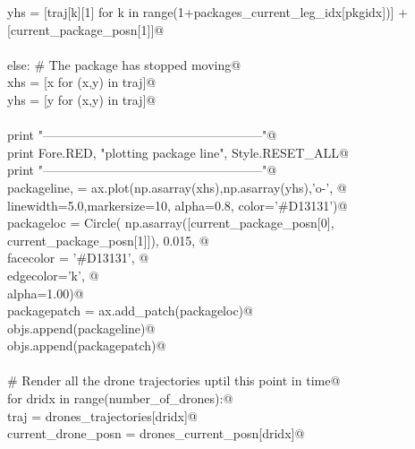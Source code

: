 \documentclass[10.0pt]{report}
\begin{document}
\begin{appendices}
\begin{flushleft}
\begin{list}{}{}
\mbox{}\verb@                  yhs = [traj[k][1] for k in range(1+packages_current_leg_idx[pkgidx])] + [current_package_posn[1]]@\\
\mbox{}\verb@@\\
\mbox{}\verb@            else: # The package has stopped moving@\\
\mbox{}\verb@                  xhs = [x for (x,y) in traj]@\\
\mbox{}\verb@                  yhs = [y for (x,y) in traj]@\\
\mbox{}\verb@@\\
\mbox{}\verb@            print "-----------------------------------------------------"@\\
\mbox{}\verb@            print Fore.RED, "plotting package line", Style.RESET_ALL@\\
\mbox{}\verb@            print "-----------------------------------------------------"@\\
\mbox{}\verb@            packageline, = ax.plot(np.asarray(xhs),np.asarray(yhs),'o-', @\\
\mbox{}\verb@                                   linewidth=5.0,markersize=10, alpha=0.8, color='#D13131')@\\
\mbox{}\verb@            packageloc   = Circle( np.asarray([current_package_posn[0], current_package_posn[1]]), 0.015, @\\
\mbox{}\verb@                                    facecolor = '#D13131', @\\
\mbox{}\verb@                                    edgecolor='k',  @\\
\mbox{}\verb@                                    alpha=1.00)@\\
\mbox{}\verb@            packagepatch = ax.add_patch(packageloc)@\\
\mbox{}\verb@            objs.append(packageline)@\\
\mbox{}\verb@            objs.append(packagepatch)@\\
\mbox{}\verb@@\\
\mbox{}\verb@        # Render all the drone trajectories   uptil this point in time@\\
\mbox{}\verb@        for dridx in range(number_of_drones):@\\
\mbox{}\verb@            traj                 = drones_trajectories[dridx]@\\
\mbox{}\verb@            current_drone_posn = drones_current_posn[dridx]@\\
\mbox{}\verb@@\\

\end{list}
\end{flushleft}
\end{appendices}
\end{document}
